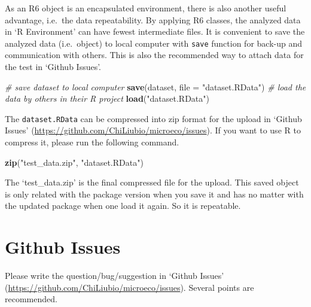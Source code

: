 \documentclass[
]{book}
\newenvironment{Shaded}{\begin{snugshade}}{\end{snugshade}}
\newcommand{\AttributeTok}[1]{\textcolor[rgb]{0.13,0.29,0.53}{#1}}
\newcommand{\CommentTok}[1]{\textcolor[rgb]{0.56,0.35,0.01}{\textit{#1}}}
\newcommand{\FunctionTok}[1]{\textcolor[rgb]{0.13,0.29,0.53}{\textbf{#1}}}
\newcommand{\NormalTok}[1]{#1}
\newcommand{\StringTok}[1]{\textcolor[rgb]{0.31,0.60,0.02}{#1}}
\begin{document}
As an R6 object is an encapsulated environment, there is also another useful advantage, i.e.~the data repeatability.
By applying R6 classes, the analyzed data in `R Environment' can have fewest intermediate files.
It is convenient to save the analyzed data (i.e.~object) to local computer with \texttt{save} function for back-up and communication with others.
This is also the recommended way to attach data for the test in `Github Issues'.

\begin{Shaded}
\begin{Highlighting}[]
\CommentTok{\# save \textquotesingle{}dataset\textquotesingle{} to local computer}
\FunctionTok{save}\NormalTok{(dataset, }\AttributeTok{file =} \StringTok{"dataset.RData"}\NormalTok{)}
\CommentTok{\# load the data by others in their R project}
\FunctionTok{load}\NormalTok{(}\StringTok{"dataset.RData"}\NormalTok{)}
\end{Highlighting}
\end{Shaded}

The \texttt{dataset.RData} can be compressed into zip format for the upload in `Github Issues' (\url{https://github.com/ChiLiubio/microeco/issues}).
If you want to use R to compress it, please run the following command.

\begin{Shaded}
\begin{Highlighting}[]
\FunctionTok{zip}\NormalTok{(}\StringTok{"test\_data.zip"}\NormalTok{, }\StringTok{"dataset.RData"}\NormalTok{)}
\end{Highlighting}
\end{Shaded}

The `test\_data.zip' is the final compressed file for the upload.
This saved object is only related with the package version when you save it and has no matter with the updated package when one load it again.
So it is repeatable.

\section{Github Issues}\label{github-issues}

Please write the question/bug/suggestion in `Github Issues' (\url{https://github.com/ChiLiubio/microeco/issues}).
Several points are recommended.
\end{document}
